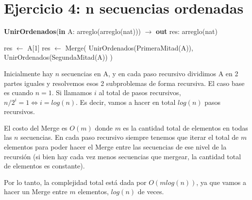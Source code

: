 \section{Ejercicio 4: n secuencias ordenadas}

\begin{algorithm}[H]
\caption{
    \textbf{UnirOrdenados}(\textbf{in} A: arreglo(arreglo(nat))) $\to$ \textbf{out} res: arreglo(nat)
}
\begin{algorithmic}[1]
        \State res $\gets$ A[1]
    \Else
        \State res $\gets$ Merge(
        \State \;\; UnirOrdenados(PrimeraMitad(A)),
        \State \;\; UnirOrdenados(SegundaMitad(A))
        \State )
    \EndIf
\end{algorithmic}
\end{algorithm}

Inicialmente hay $n$ secuencias en A, y en cada paso recursivo dividimos A en 2 partes iguales y resolvemos esos 2 subproblemas de forma recursiva. El caso base es cuando $n = 1$. Si llamamos $i$ al total de pasos recursivos, $n / 2^i = 1 \iff i = log(n)$. Es decir, vamos a hacer en total $log(n)$ pasos recursivos.

El costo del Merge es $O(m)$ donde $m$ es la cantidad total de elementos en todas las $n$ secuencias. En cada paso recursivo siempre tenemos que iterar el total de $m$ elementos para poder hacer el Merge entre las secuencias de ese nivel de la recursión (si bien hay cada vez menos secuencias que mergear, la cantidad total de elementos es constante).

Por lo tanto, la complejidad total está dada por $O(m log(n))$, ya que vamos a hacer un Merge entre $m$ elementos, $log(n)$ de veces.
